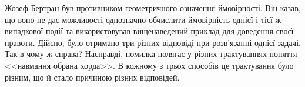 \begin{example}
    Жозеф Бертран був противником геометричного означення ймовірності.
    Він казав, що воно не дає можливості однозначно обчислити ймовірність
    однієї і тієї ж випадкової події та використовував вищенаведений приклад
    для доведення своєї правоти. Дійсно, було отримано три різних відповіді при
    розв'язанні однієї задачі. Так в чому ж справа? Насправді, помилка полягає
    у різних трактуваннях поняття <<навмання обрана хорда>>.
    В кожному з трьох способів це трактування було різним, що й стало причиною різних відповідей.
\end{example}
